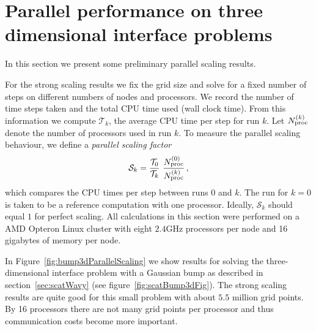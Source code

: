 \newcommand{\runTimek}{\mathcal{T}_k}
\newcommand{\runTimez}{\mathcal{T}_0}
\newcommand{\scalek}{\mathcal{S}_k}
\newcommand{\Nptk}{\mathcal{N}_{{\rm point}}\sp{(k)}}
\newcommand{\Npk}{N_{{\rm proc}}\sp{(k)}}
\newcommand{\Nptz}{\mathcal{N}_{p,0}}
\newcommand{\Npz}{N_{{\rm proc}}\sp{(0)}}
\newcommand{\Nstepk}{N_{{\rm step}}\sp{(k)}}
% 
\section{Parallel performance on three dimensional interface problems}\label{sec:parallelPerformance}

In this section we present some preliminary parallel scaling results. 

For the strong scaling results we fix the grid size and solve for a fixed number
of steps on different numbers of nodes and processors.  We record the number of
time steps taken and the total CPU time used (wall clock time).  From this
information we compute $\runTimek$, the average CPU time per step for run $k$.
Let $\Npk$ denote the number of processors used in run $k$.  To measure the
parallel scaling behaviour, we define a {\em parallel scaling factor}
\[
\scalek={\runTimez\over\runTimek}~{\Npz \over \Npk}\,,
\]
which compares the CPU times per step between runs $0$ and $k$.  The run for 
$k=0$ is taken to be a reference computation with one processor. Ideally, $\scalek$ should
equal $1$ for perfect scaling. 
All calculations in this section were performed on a AMD Opteron Linux cluster with eight $2.4$GHz 
processors per node and 16 gigabytes of memory per node.

In Figure~\ref{fig:bump3dParallelScaling} we show results for solving the
three-dimensional interface problem with a Gaussian bump as described in
section~\ref{sec:scatWavy} (see figure~\ref{fig:scatBump3dFig}). The strong scaling
results are quite good for this small problem with about $5.5$ million grid points. 
By 16 processors there are not many grid points per processor and thus communication
costs become more important. 


